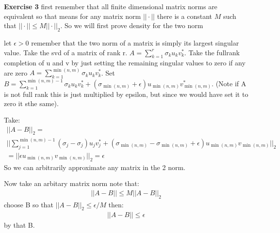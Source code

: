 \documentclass[12pt]{article}
\newenvironment{exercise}[1]{\vspace{.1in}\noindent\textbf{Exercise #1 \hspace{.05em}}}{}
\theoremstyle{definition}
\theoremstyle{remark}
\begin{document}
\begin{exercise}{3}
	first remember that all finite dimensional matrix norms are equivalent so that means for any matrix norm $||\cdot||$ there is a constant $M$ such that $||\cdot||\leq M||\cdot||_2$. So we will first prove density for  the two norm

	let $\epsilon >0$ remember that the two norm of a matrix is simply its largest singular value. Take the svd of a matrix of rank r. $A=\sum_{k=1}^r\sigma_ku_kv_k^*$. Take the fullrank completion of u and v by just setting the remaining singular values to zero if any are zero $A=\sum_{k=1}^{\min(n,m)}\sigma_ku_kv_k^*$. Set $B=\sum_{k=1}^{\min(n,m)-1}\sigma_ku_kv_k^*+(\sigma_{\min(n,m)}+\epsilon)u_{\min(n,m)}v_{\min(n,m)}^*$. (Note if A is not full rank this is just multiplied by epsilon, but since we would have set it to zero it sthe same).

	Take:
	\begin{align}
		||A-B||_2=                                                                                                                           \\
		||\sum_{j=1}^{\min(n,m)-1}(\sigma_j-\sigma_j)u_jv_j^*+(\sigma_{\min(n,m)}-\sigma_{\min(n,m)}+\epsilon)u_{\min(n,m)}v_{\min(n,m)}||_2 \\
		=||\epsilon u_{\min(n,m)}v_{\min(n,m)}||_2=\epsilon
	\end{align}
	So we can arbitrarily approximate any matrix in the 2 norm.

	Now take an arbitary matrix norm note that:
	\begin{align}
		||A-B||\leq M||A-B||_2
	\end{align}
	choose B so that $||A-B||_2\leq \epsilon/M$ then:
	\begin{align}
		||A-B||\leq \epsilon
	\end{align}
	by that B.
\end{exercise}
\end{document}
